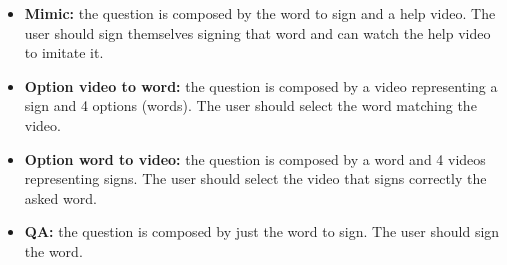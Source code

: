 \begin{itemize}
    \item \textbf{Mimic:} the question is composed by the word to sign and a help video. The user should sign themselves signing that word and can watch the help video to imitate it.
    \item \textbf{Option video to word:} the question is composed by a video representing a sign and 4 options (words). The user should select the word matching the video.
    \item \textbf{Option word to video:} the question is composed by a word and 4 videos representing signs. The user should select the video that signs correctly the asked word.
    \item \textbf{QA:} the question is composed by just the word to sign. The user should sign the word.
\end{itemize}
